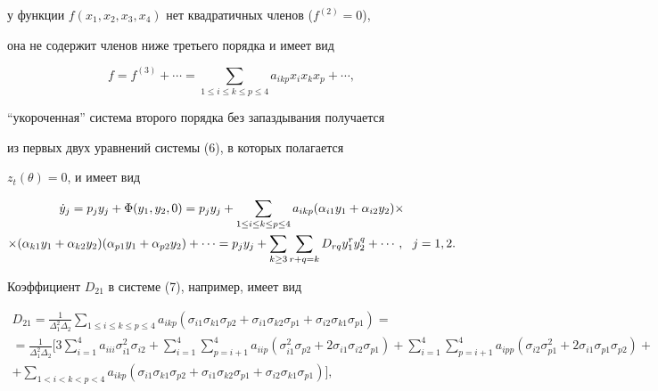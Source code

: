 у функции $f(x_1,x_2,x_3,x_4)$ нет квадратичных членов ($f^{(2)}=0$), 


она не содержит членов ниже третьего порядка и имеет вид 


$$ 


f=f^{(3)}+\dotsb=\sum_{1\le i\le k\le p\le4} 


a_{ikp}x_i x_k x_p+\dotsb, 


$$ 


``укороченная'' система второго порядка без запаздывания получается 


из первых двух уравнений системы (6), в которых полагается 


$z_t(\theta)=0$, и имеет вид 


\begin{gather} 


\Dot y_j=p_j y_j+\Phi(y_1,y_2,0)=p_j y_j+ 


\sum_{1\le i\le k\le p\le 4}a_{ikp}


(\alpha_{i1}y_1+\alpha_{i2}y_2)\times\notag \\ 


\times(\alpha_{k1}y_1+\alpha_{k2}y_2) 


(\alpha_{p1}y_1+\alpha_{p2}y_2)+\dotsb = 


p_j y_j+\sum_{k\ge3}\sum_{r+q=k}D_{rq} 


y^r_1y^q_2+\dotsb,\ \ j=1,2. 


\end{gather} 


 


Коэффициент $D_{21}$ в системе (7), например, имеет вид 


\begin{multline} 


D_{21}=\frac{1}{\Delta^2_1\Delta_2} 


\sum_{1\le i\le k\le p\le 4}a_{ikp} 


(\sigma_{i1}\sigma_{k1}\sigma_{p2}+ 


\sigma_{i1}\sigma_{k2}\sigma_{p1}+ 


\sigma_{i2}\sigma_{k1}\sigma_{p1})= \\ =\frac{1}{\Delta^2_1\Delta_2} 


\bigg[3\sum^4_{i=1}a_{iii}\sigma^2_{i1}\sigma_{i2}+ 


\sum^4_{i=1}\sum^4_{p=i+1}a_{iip}(\sigma^2_{i1}\sigma_{p2}+ 


2\sigma_{i1}\sigma_{i2}\sigma_{p1})+ 


\sum^4_{i=1}\sum^4_{p=i+1}a_{ipp} 


(\sigma_{i2}\sigma^2_{p1}+2\sigma_{i1}\sigma_{p1}\sigma_{p2})+ \\ 


% 


+\sum_{1<i<k<p<4}a_{ikp} 


(\sigma_{i1}\sigma_{k1}\sigma_{p2}+ 


\sigma_{i1}\sigma_{k2}\sigma_{p1}+ 


\sigma_{i2}\sigma_{k1}\sigma_{p1})\bigg], 


\end{multline} 


